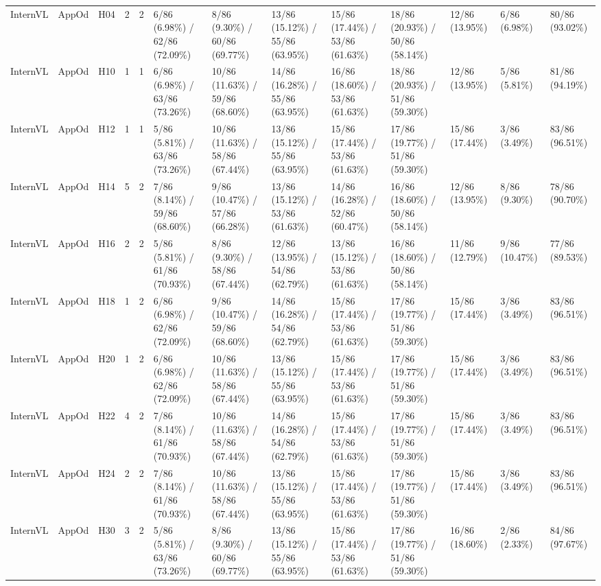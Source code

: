 \begin{table}
\begin{tabular}{lllrrllllllll}
InternVL & AppOd & H04 & 2 & 2 & 6/86 (6.98\%) / 62/86 (72.09\%) & 8/86 (9.30\%) / 60/86 (69.77\%) & 13/86 (15.12\%) / 55/86 (63.95\%) & 15/86 (17.44\%) / 53/86 (61.63\%) & 18/86 (20.93\%) / 50/86 (58.14\%) & 12/86 (13.95\%) & 6/86 (6.98\%) & 80/86 (93.02\%) \\
InternVL & AppOd & H10 & 1 & 1 & 6/86 (6.98\%) / 63/86 (73.26\%) & 10/86 (11.63\%) / 59/86 (68.60\%) & 14/86 (16.28\%) / 55/86 (63.95\%) & 16/86 (18.60\%) / 53/86 (61.63\%) & 18/86 (20.93\%) / 51/86 (59.30\%) & 12/86 (13.95\%) & 5/86 (5.81\%) & 81/86 (94.19\%) \\
InternVL & AppOd & H12 & 1 & 1 & 5/86 (5.81\%) / 63/86 (73.26\%) & 10/86 (11.63\%) / 58/86 (67.44\%) & 13/86 (15.12\%) / 55/86 (63.95\%) & 15/86 (17.44\%) / 53/86 (61.63\%) & 17/86 (19.77\%) / 51/86 (59.30\%) & 15/86 (17.44\%) & 3/86 (3.49\%) & 83/86 (96.51\%) \\
InternVL & AppOd & H14 & 5 & 2 & 7/86 (8.14\%) / 59/86 (68.60\%) & 9/86 (10.47\%) / 57/86 (66.28\%) & 13/86 (15.12\%) / 53/86 (61.63\%) & 14/86 (16.28\%) / 52/86 (60.47\%) & 16/86 (18.60\%) / 50/86 (58.14\%) & 12/86 (13.95\%) & 8/86 (9.30\%) & 78/86 (90.70\%) \\
InternVL & AppOd & H16 & 2 & 2 & 5/86 (5.81\%) / 61/86 (70.93\%) & 8/86 (9.30\%) / 58/86 (67.44\%) & 12/86 (13.95\%) / 54/86 (62.79\%) & 13/86 (15.12\%) / 53/86 (61.63\%) & 16/86 (18.60\%) / 50/86 (58.14\%) & 11/86 (12.79\%) & 9/86 (10.47\%) & 77/86 (89.53\%) \\
InternVL & AppOd & H18 & 1 & 2 & 6/86 (6.98\%) / 62/86 (72.09\%) & 9/86 (10.47\%) / 59/86 (68.60\%) & 14/86 (16.28\%) / 54/86 (62.79\%) & 15/86 (17.44\%) / 53/86 (61.63\%) & 17/86 (19.77\%) / 51/86 (59.30\%) & 15/86 (17.44\%) & 3/86 (3.49\%) & 83/86 (96.51\%) \\
InternVL & AppOd & H20 & 1 & 2 & 6/86 (6.98\%) / 62/86 (72.09\%) & 10/86 (11.63\%) / 58/86 (67.44\%) & 13/86 (15.12\%) / 55/86 (63.95\%) & 15/86 (17.44\%) / 53/86 (61.63\%) & 17/86 (19.77\%) / 51/86 (59.30\%) & 15/86 (17.44\%) & 3/86 (3.49\%) & 83/86 (96.51\%) \\
InternVL & AppOd & H22 & 4 & 2 & 7/86 (8.14\%) / 61/86 (70.93\%) & 10/86 (11.63\%) / 58/86 (67.44\%) & 14/86 (16.28\%) / 54/86 (62.79\%) & 15/86 (17.44\%) / 53/86 (61.63\%) & 17/86 (19.77\%) / 51/86 (59.30\%) & 15/86 (17.44\%) & 3/86 (3.49\%) & 83/86 (96.51\%) \\
InternVL & AppOd & H24 & 2 & 2 & 7/86 (8.14\%) / 61/86 (70.93\%) & 10/86 (11.63\%) / 58/86 (67.44\%) & 13/86 (15.12\%) / 55/86 (63.95\%) & 15/86 (17.44\%) / 53/86 (61.63\%) & 17/86 (19.77\%) / 51/86 (59.30\%) & 15/86 (17.44\%) & 3/86 (3.49\%) & 83/86 (96.51\%) \\
InternVL & AppOd & H30 & 3 & 2 & 5/86 (5.81\%) / 63/86 (73.26\%) & 8/86 (9.30\%) / 60/86 (69.77\%) & 13/86 (15.12\%) / 55/86 (63.95\%) & 15/86 (17.44\%) / 53/86 (61.63\%) & 17/86 (19.77\%) / 51/86 (59.30\%) & 16/86 (18.60\%) & 2/86 (2.33\%) & 84/86 (97.67\%) \\
\bottomrule
\end{tabular}
\end{table}
